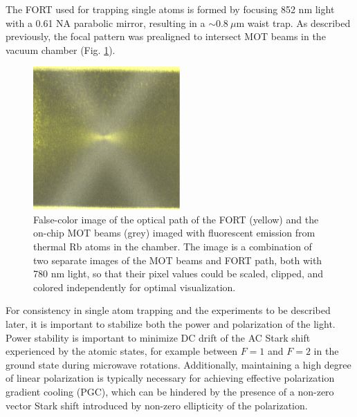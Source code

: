 The FORT used for trapping single atoms is formed by focusing 852 nm light with a 0.61 NA parabolic mirror, resulting in a $\sim0.8~\mu$m waist trap. As described previously, the focal pattern was prealigned to intersect MOT beams in the vacuum chamber (Fig. \ref{fig:parabolicfluorescence}).
\begin{figure}[!ht]
    \centering
    \includegraphics[width=0.5\textwidth]{Images/mirror_fluorescence_and_chip_beams_yellow.pdf}
    \caption{False-color image of the optical path of the FORT (yellow) and the on-chip MOT beams (grey) imaged with fluorescent emission from thermal Rb atoms in the chamber. The image is a combination of two separate images of the MOT beams and FORT path, both with 780 nm light, so that their pixel values could be scaled, clipped, and colored independently for optimal visualization.}
    \label{fig:parabolicfluorescence}
\end{figure}
For consistency in single atom trapping and the experiments to be described later, it is important to stabilize both the power and polarization of the light. Power stability is important to minimize DC drift of the AC Stark shift experienced by the atomic states, for example between $F=1$ and $F=2$ in the ground state during microwave rotations. Additionally, maintaining a high degree of linear polarization is typically necessary for achieving effective polarization gradient cooling (PGC), which can be hindered by the presence of a non-zero vector Stark shift introduced by non-zero ellipticity of the polarization\cite{chin2017polarization}.

